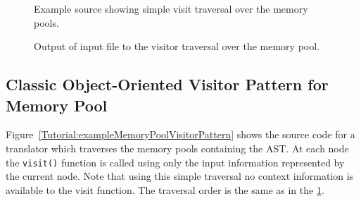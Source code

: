 \begin{figure}[!h]
{\indent
{\mySmallFontSize

\begin{latexonly}
   
\end{latexonly}

\begin{htmlonly}
   
\end{htmlonly}

}
}
\caption{Example source showing simple visit traversal over the memory pools.}
\label{Tutorial:exampleMemoryPoolVisitorTraversal}
\end{figure}



\begin{figure}[!h]
{\indent
{\mySmallFontSize


\begin{latexonly}
   
\end{latexonly}

\begin{htmlonly}
   
\end{htmlonly}

}
}
\caption{Output of input file to the visitor traversal over the memory pool.}
\label{Tutorial:exampleOutput_MemoryPoolVisitorTraversal}
\end{figure}


\clearpage
\subsection{Classic Object-Oriented Visitor Pattern for Memory Pool}

Figure~\ref{Tutorial:exampleMemoryPoolVisitorPattern} shows the source code 
for a translator which traverses the memory pools containing the AST.  
At each node the {\tt visit()} function is called using only the input 
information represented by the current node.  Note that using this simple 
traversal no context information is available to the visit function. 
The traversal order is the same as in the \ref{Tutorial:exampleMemoryPoolVisitorTraversal}.

